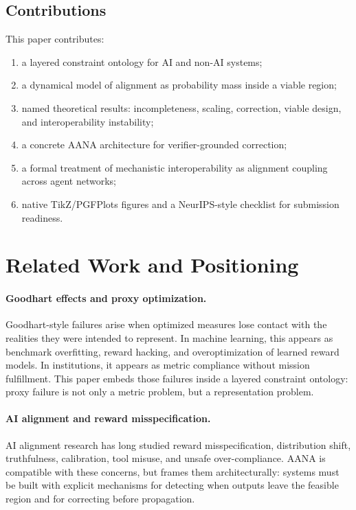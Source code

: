 \documentclass[11pt]{article}
\begin{document}
\subsection{Contributions}

This paper contributes:
\begin{enumerate}
    \item a layered constraint ontology for AI and non-AI systems;
    \item a dynamical model of alignment as probability mass inside a viable region;
    \item named theoretical results: incompleteness, scaling, correction, viable design, and interoperability instability;
    \item a concrete AANA architecture for verifier-grounded correction;
    \item a formal treatment of mechanistic interoperability as alignment coupling across agent networks;
    \item native TikZ/PGFPlots figures and a NeurIPS-style checklist for submission readiness.
\end{enumerate}

\section{Related Work and Positioning}

\paragraph{Goodhart effects and proxy optimization.} Goodhart-style failures arise when optimized measures lose contact with the realities they were intended to represent. In machine learning, this appears as benchmark overfitting, reward hacking, and overoptimization of learned reward models. In institutions, it appears as metric compliance without mission fulfillment. This paper embeds those failures inside a layered constraint ontology: proxy failure is not only a metric problem, but a representation problem.

\paragraph{AI alignment and reward misspecification.} AI alignment research has long studied reward misspecification, distribution shift, truthfulness, calibration, tool misuse, and unsafe over-compliance. AANA is compatible with these concerns, but frames them architecturally: systems must be built with explicit mechanisms for detecting when outputs leave the feasible region and for correcting before propagation.
\end{document}
